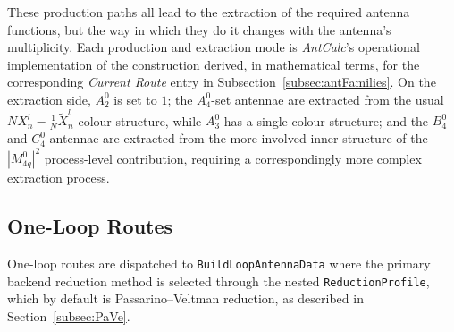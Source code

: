 \begin{table}[h!]
\footnotesize
\centering
\caption{Overview of the tree-level production and extraction modes.}
\renewcommand{\arraystretch}{1.3}
  
\label{tab:treeLevelProdModes}
\end{table}

These production paths all lead to the extraction of the required antenna functions, but the way in which
they do it changes with the antenna's multiplicity. Each production and extraction mode is
\textit{AntCalc}'s operational implementation of the construction derived, in mathematical terms, for the
corresponding \textit{Current Route} entry in Subsection~\ref{subsec:antFamilies}. On the extraction side,
$A_2^0$ is set to $1$; the $A_4^0$-set antennae are extracted from the usual
$NX_n^l - \frac1N\tilde X_n^l$ colour structure, while $A_3^0$ has a single colour structure; and the $B_4^0$ and $C_4^0$ antennae are extracted from the more
involved inner structure of the $|M_{4q}^0|^2$ process-level contribution, requiring a correspondingly more complex
extraction process.

\subsection{One-Loop Routes}\label{subsec:oneLoopRoutes}

One-loop routes are dispatched to \texttt{BuildLoopAntennaData} where the primary backend
reduction method is selected through the nested \texttt{ReductionProfile}, which by default is
Passarino--Veltman reduction, as described in Section~\ref{subsec:PaVe}.

